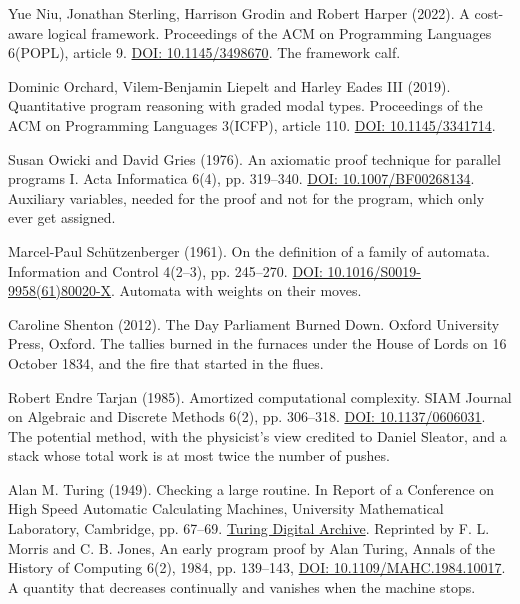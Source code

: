 \noindent Yue Niu, Jonathan Sterling, Harrison Grodin and Robert Harper (2022). A cost-aware logical framework. Proceedings of the ACM on Programming Languages 6(POPL), article 9. \href{https://doi.org/10.1145/3498670}{DOI: 10.1145/3498670}. The framework calf.
\par\medskip

\noindent Dominic Orchard, Vilem-Benjamin Liepelt and Harley Eades III (2019). Quantitative program reasoning with graded modal types. Proceedings of the ACM on Programming Languages 3(ICFP), article 110. \href{https://doi.org/10.1145/3341714}{DOI: 10.1145/3341714}.
\par\medskip

\noindent Susan Owicki and David Gries (1976). An axiomatic proof technique for parallel programs I. Acta Informatica 6(4), pp. 319--340. \href{https://doi.org/10.1007/BF00268134}{DOI: 10.1007/BF00268134}. Auxiliary variables, needed for the proof and not for the program, which only ever get assigned.
\par\medskip

\noindent Marcel-Paul Sch\"utzenberger (1961). On the definition of a family of automata. Information and Control 4(2--3), pp. 245--270. \href{https://doi.org/10.1016/S0019-9958(61)80020-X}{DOI: 10.1016/S0019-9958(61)80020-X}. Automata with weights on their moves.
\par\medskip

\noindent Caroline Shenton (2012). The Day Parliament Burned Down. Oxford University Press, Oxford. The tallies burned in the furnaces under the House of Lords on 16 October 1834, and the fire that started in the flues.
\par\medskip

\noindent Robert Endre Tarjan (1985). Amortized computational complexity. SIAM Journal on Algebraic and Discrete Methods 6(2), pp. 306--318. \href{https://doi.org/10.1137/0606031}{DOI: 10.1137/0606031}. The potential method, with the physicist's view credited to Daniel Sleator, and a stack whose total work is at most twice the number of pushes.
\par\medskip

\noindent Alan M. Turing (1949). Checking a large routine. In Report of a Conference on High Speed Automatic Calculating Machines, University Mathematical Laboratory, Cambridge, pp. 67--69. \href{https://turingarchive.kings.cam.ac.uk/publications-lectures-and-talks-amtb/amt-b-8}{Turing Digital Archive}. Reprinted by F. L. Morris and C. B. Jones, An early program proof by Alan Turing, Annals of the History of Computing 6(2), 1984, pp. 139--143, \href{https://doi.org/10.1109/MAHC.1984.10017}{DOI: 10.1109/MAHC.1984.10017}. A quantity that decreases continually and vanishes when the machine stops.
\par\medskip

